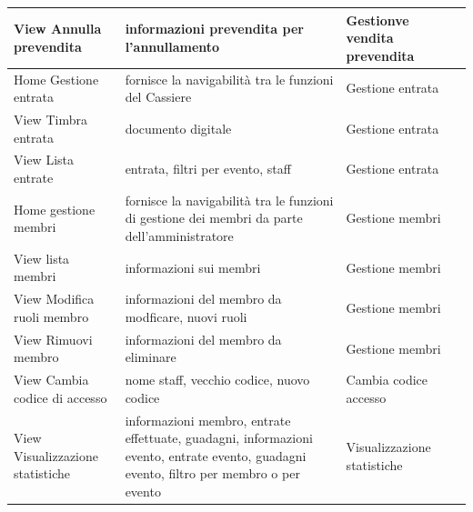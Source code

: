\documentclass[a4paper]{article}
\begin{document}
\begin{center}
\begin{tabularx}{1\textwidth}{|X|X|X|X|}
    \hline
    View Annulla prevendita & informazioni prevendita per l'annullamento & Gestionve vendita prevendita\\
    \hline
    Home Gestione entrata & fornisce la navigabilità tra le funzioni del Cassiere & Gestione entrata\\
    \hline
    View Timbra entrata & documento digitale & Gestione entrata\\
    \hline
    View Lista entrate & entrata, filtri per evento, staff & Gestione entrata\\
    \hline
    Home gestione membri & fornisce la navigabilità tra le funzioni di gestione dei membri da parte dell'amministratore & Gestione membri\\
    \hline
    View lista membri & informazioni sui membri & Gestione membri\\
    \hline
    View Modifica ruoli membro & informazioni del membro da modficare, nuovi ruoli & Gestione membri\\
    \hline
    View Rimuovi membro & informazioni del membro da eliminare & Gestione membri\\
    \hline
    View Cambia codice di accesso & nome staff, vecchio codice, nuovo codice & Cambia codice accesso\\
    \hline
    View Visualizzazione statistiche & informazioni membro, entrate effettuate, guadagni, informazioni evento, entrate evento, guadagni evento, filtro per membro o per evento & Visualizzazione statistiche\\
    \hline
    \end{tabularx}
\end{center}
\end{document}
